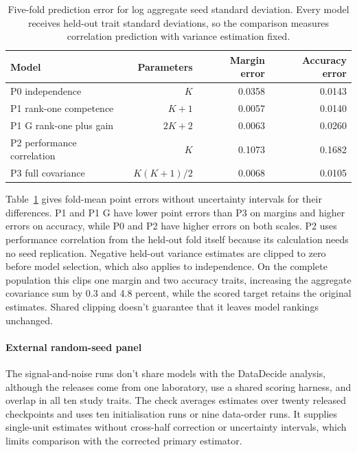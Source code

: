 \begin{table}[!htb]
\centering
\caption{Five-fold prediction error for log aggregate seed standard deviation. Every model receives held-out trait standard deviations, so the comparison measures correlation prediction with variance estimation fixed.}
\label{tab:original11}
\small\setlength{\tabcolsep}{4pt}\renewcommand{\arraystretch}{1.12}
\begin{tabular}{lrrr}\toprule
Model & Parameters & Margin error & Accuracy error\\\midrule
P0 independence & $K$ & 0.0358 & 0.0143\\
P1 rank-one competence & $K+1$ & 0.0057 & 0.0140\\
P1 G rank-one plus gain & $2K+2$ & 0.0063 & 0.0260\\
P2 performance correlation & $K$ & 0.1073 & 0.1682\\
P3 full covariance & $K(K+1)/2$ & 0.0068 & 0.0105\\\bottomrule
\end{tabular}
\end{table}

Table~\ref{tab:original11} gives fold-mean point errors without uncertainty intervals for their differences. P1 and P1 G have lower point errors than P3 on margins and higher errors on accuracy, while P0 and P2 have higher errors on both scales. P2 uses performance correlation from the held-out fold itself because its calculation needs no seed replication. Negative held-out variance estimates are clipped to zero before model selection, which also applies to independence. On the complete population this clips one margin and two accuracy traits, increasing the aggregate covariance sum by 0.3 and 4.8 percent, while the scored target retains the original estimates. Shared clipping doesn't guarantee that it leaves model rankings unchanged.

\paragraph{External random-seed panel}
The signal-and-noise runs don't share models with the DataDecide analysis, although the releases come from one laboratory, use a shared scoring harness, and overlap in all ten study traits. The check averages estimates over twenty released checkpoints and uses ten initialisation runs or nine data-order runs. It supplies single-unit estimates without cross-half correction or uncertainty intervals, which limits comparison with the corrected primary estimator.

